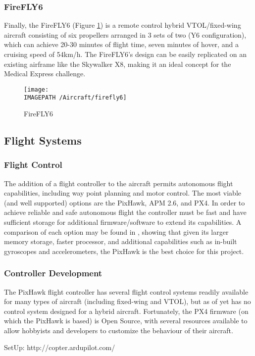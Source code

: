 \subsubsection*{FireFLY6}
Finally, the FireFLY6\cite{ref:firefly6} (Figure \ref{fig:firefly6}) is a remote control hybrid VTOL/fixed-wing aircraft consisting of six propellers arranged in 3 sets of two (Y6 configuration), which can achieve 20-30 minutes of flight time, seven minutes of hover, and a cruising speed of 54km/h. The FireFLY6's design can be easily replicated on an existing airframe like the Skywalker X8, making it an ideal concept for the Medical Express challenge.\\

\begin{figure}[!h]
	\centering
	\texttt{[image: \\IMAGEPATH /Aircraft/firefly6]}
	\caption{FireFLY6}
	\label{fig:firefly6}
\end{figure}

\subsection{Flight Systems}
\subsubsection*{Flight Control}
The addition of a flight controller to the aircraft permits autonomous flight capabilities, including way point planning and motor control. The most viable (and well supported) options are the PixHawk\cite{ref:pixhawk}, APM 2.6\cite{ref:ardupilot}, and PX4\cite{ref:px4}. In order to achieve reliable and safe autonomous flight the controller must be fast and have sufficient storage for additional firmware/software to extend its capabilities. A comparison of each option may be found in \cite{ref:controller_comparison}, showing that given its larger memory storage, faster processor, and additional capabilities such as in-built gyroscopes and accelerometers, the PixHawk is the best choice for this project.

\subsubsection*{Controller Development}
The PixHawk flight controller has several flight control systems readily available for many types of aircraft (including fixed-wing and VTOL), but as of yet has no control system designed for a hybrid aircraft. Fortunately, the PX4 firmware (on which the PixHawk is based) is Open Source\cite{ref:ardupilotgit}, with several resources available\cite{ref:firmware1,ref:firmware2} to allow hobbyists and developers to customize the behaviour of their aircraft.

\color{red}
SetUp:
http://copter.ardupilot.com/
\color{black}